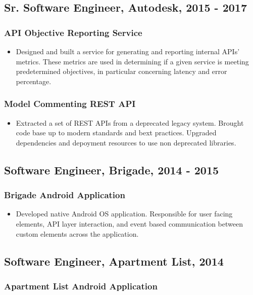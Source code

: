 \documentclass[11pt]{article}
\begin{document}
\subsection*{Sr. Software Engineer, Autodesk, 2015 - 2017}
\label{sec-1-3}
\subsubsection*{API Objective Reporting Service}
\label{sec-1-3-1}

\begin{itemize}
\item Designed and built a service for generating and reporting internal APIs' metrics. These metrics are used in determining if a given service is meeting predetermined objectives, in particular concerning latency and error percentage.
\end{itemize}
\subsubsection*{Model Commenting REST API}
\label{sec-1-3-2}

\begin{itemize}
\item Extracted a set of REST APIs from a deprecated legacy system. Brought code base up to modern standards and bext practices. Upgraded dependencies and depoyment resources to use non deprecated libraries.
\end{itemize}
\subsection*{Software Engineer, Brigade, 2014 - 2015}
\label{sec-1-4}
\subsubsection*{Brigade Android Application}
\label{sec-1-4-1}

\begin{itemize}
\item Developed native Android OS application. Responsible for user facing elements, API layer interaction, and event based communication between custom elements across the application.
\end{itemize}
\subsection*{Software Engineer, Apartment List, 2014}
\label{sec-1-5}
\subsubsection*{Apartment List Android Application}
\label{sec-1-5-1}
\end{document}
